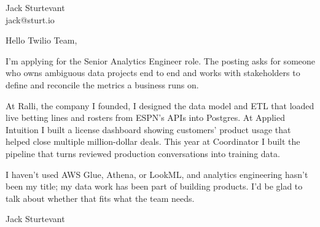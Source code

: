 \documentclass[11pt]{article}
\begin{document}
\raggedright

{\namefont\fontsize{20pt}{24pt}\selectfont Jack Sturtevant}\\[-0.3em]
jack@sturt.io

\vspace{1.2em}

Hello Twilio Team,

I'm applying for the Senior Analytics Engineer role. The posting asks for someone who owns ambiguous data projects end to end and works with stakeholders to define and reconcile the metrics a business runs on.

At Ralli, the company I founded, I designed the data model and ETL that loaded live betting lines and rosters from ESPN's APIs into Postgres. At Applied Intuition I built a license dashboard showing customers' product usage that helped close multiple million-dollar deals. This year at Coordinator I built the pipeline that turns reviewed production conversations into training data.

I haven't used AWS Glue, Athena, or LookML, and analytics engineering hasn't been my title; my data work has been part of building products. I'd be glad to talk about whether that fits what the team needs.

\vspace{0.6em}
Jack Sturtevant
\end{document}

